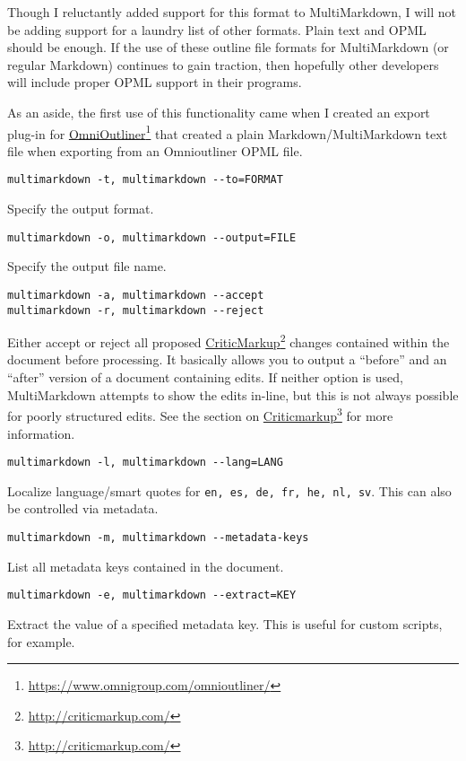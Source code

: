 Though I reluctantly added support for this format to MultiMarkdown, I will not be adding support for a laundry list of other formats. Plain text and OPML should be enough. If the use of these outline file formats for MultiMarkdown (or regular Markdown) continues to gain traction, then hopefully other developers will include proper OPML support in their programs.

As an aside, the first use of this functionality came when I created an export plug-in for \href{https://www.omnigroup.com/omnioutliner/}{OmniOutliner}\footnote{\href{https://www.omnigroup.com/omnioutliner/}{https:\slash \slash www.omnigroup.com\slash omnioutliner\slash }} that created a plain Markdown\slash MultiMarkdown text file when exporting from an Omnioutliner OPML file.

\begin{verbatim}
multimarkdown -t, multimarkdown --to=FORMAT
\end{verbatim}

Specify the output format.

\begin{verbatim}
multimarkdown -o, multimarkdown --output=FILE
\end{verbatim}

Specify the output file name.

\begin{verbatim}
multimarkdown -a, multimarkdown --accept
multimarkdown -r, multimarkdown --reject
\end{verbatim}

Either accept or reject all proposed \href{http://criticmarkup.com/}{CriticMarkup}\footnote{\href{http://criticmarkup.com/}{http:\slash \slash criticmarkup.com\slash }} changes contained within the document before processing. It basically allows you to output a ``before'' and an ``after'' version of a document containing edits. If neither option is used, MultiMarkdown attempts to show the edits in-line, but this is not always possible for poorly structured edits. See the section on \href{http://criticmarkup.com/}{Criticmarkup}\footnote{\href{http://criticmarkup.com/}{http:\slash \slash criticmarkup.com\slash }} for more information.

\begin{verbatim}
multimarkdown -l, multimarkdown --lang=LANG
\end{verbatim}

Localize language\slash smart quotes for \texttt{en, es, de, fr, he, nl, sv}. This can also be controlled via metadata.

\begin{verbatim}
multimarkdown -m, multimarkdown --metadata-keys
\end{verbatim}

List all metadata keys contained in the document.

\begin{verbatim}
multimarkdown -e, multimarkdown --extract=KEY
\end{verbatim}

Extract the value of a specified metadata key. This is useful for custom scripts, for example.



